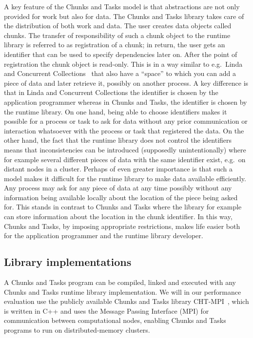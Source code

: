 \documentclass{elsarticle}
\begin{document}
A key feature of the Chunks and Tasks model is that abstractions are
not only provided for work but also for data.  The Chunks and Tasks
library takes care of the distribution of both work and data. The user
creates data objects called chunks. The transfer of responsibility of
such a chunk object to the runtime library is referred to as
registration of a chunk; in return, the user gets an identifier that
can be used to specify dependencies later on.  After the point of
registration the chunk object is read-only.  This is in a way similar
to e.g.~Linda~\cite{Carriero1994633} and Concurrent
Collections~\cite{CnC} that also have a ``space'' to which you can add
a piece of data and later retrieve it, possibly on another process. A
key difference is that in Linda and Concurrent Collections the
identifier is chosen by the application programmer whereas in Chunks
and Tasks, the identifier is chosen by the runtime library. On one
hand, being able to choose identifiers makes it possible for a process
or task to ask for data without any prior communication or interaction
whatsoever with the process or task that registered the data.
On the other hand, the fact that the runtime library does not control
the identifiers means that inconsistencies can be introduced
(supposedly unintentionally) where for example several different
pieces of data with the same identifier exist, e.g.~on distant nodes
in a cluster.
Perhaps of even greater importance is that such a model makes it
difficult for the runtime library to make data available efficiently.
Any process may ask for any piece of data at any time possibly
without any information being available locally about the location of
the piece being asked for.  This stands in contrast to Chunks and
Tasks where the library for example can store information about the
location in the chunk identifier.  In this way, Chunks and Tasks,
by imposing appropriate restrictions, makes life easier both for the
application programmer and the runtime library developer.

\subsection{Library implementations}\label{subsec:cht-lib-impl}

A Chunks and Tasks program can be compiled, linked and executed with
any Chunks and Tasks runtime library implementation. We will in our
performance evaluation use the publicly available Chunks and Tasks
library CHT-MPI~\cite{cht-mpi, chunks-and-tasks}, which is written in
C++ and uses the Message Passing Interface (MPI) for communication
between computational nodes, enabling Chunks and Tasks programs to run
on distributed-memory clusters.
\end{document}
